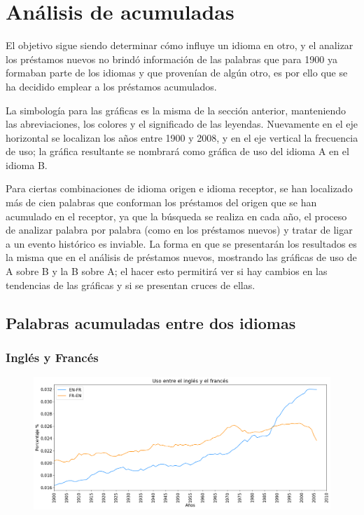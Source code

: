 \chapter{Análisis de acumuladas}

El objetivo sigue siendo determinar cómo influye un idioma en otro,  y el analizar los préstamos nuevos no brindó información de las palabras que para 1900 ya formaban parte de los idiomas y que provenían de algún otro, es por ello que se ha decidido emplear a los préstamos acumulados.  

La simbología para las gráficas es la misma de la sección anterior, manteniendo las abreviaciones, los colores y el significado de las leyendas.  Nuevamente en el eje horizontal se localizan los años  entre 1900 y 2008, y en el eje vertical la frecuencia de uso; la gráfica resultante se nombrará como gráfica de uso del idioma A en el idioma B. 

Para ciertas combinaciones de idioma origen e idioma receptor, se han localizado más de cien palabras que conforman los préstamos del origen que se han acumulado en el receptor, ya que la búsqueda se realiza en cada año, el proceso de analizar palabra por palabra (como en los préstamos nuevos) y tratar de ligar a un evento histórico es inviable. La forma en que se presentarán los resultados es la misma que en el análisis de préstamos nuevos,  mostrando las gráficas de uso de A sobre B y la B sobre A; el hacer esto permitirá ver si hay cambios en las tendencias de las gráficas y si se presentan cruces de ellas.

\newpage
\section{Palabras acumuladas entre dos idiomas}

\subsection{Inglés y Francés}

\begin{figure}[h!]
	\centering
	\includegraphics[scale=.38]{Cap_3/SF_1_S2_EN.png}
	\label{SF_EF}
	\caption{}
\end{figure}


